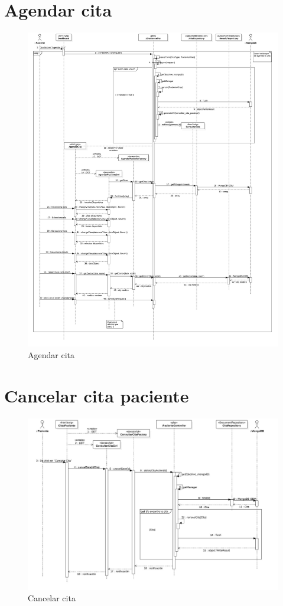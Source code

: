 \section{Agendar cita}
\begin{figure}[htbp!]
	\centering
	\includegraphics[width=1\textwidth]{uml/DiagramasSecuencia/AdrianGalindo/agendarCita}
	\caption{Agendar cita}
\end{figure}

\newpage
\section{Cancelar cita paciente}
\begin{figure}[htbp!]
	\centering
	\includegraphics[width=1\textwidth]{uml/DiagramasSecuencia/AdrianGalindo/cancelarCitaPaciente}
	\caption{Cancelar cita}
\end{figure}
\newpage

